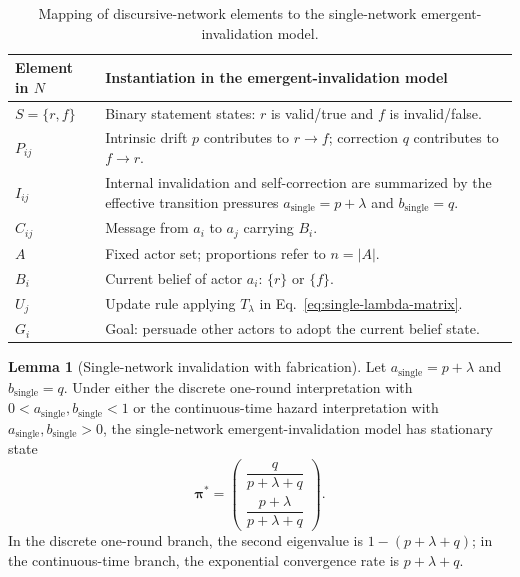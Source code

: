 \documentclass[12pt]{article}
\theoremstyle{definition}
\newtheorem{lemma}{Lemma}[section]
\begin{document}
\begin{table}[htbp]
    \centering
    \setlength{\tabcolsep}{6pt}
    \renewcommand{\arraystretch}{1.15}
    \caption{Mapping of discursive-network elements to the single-network emergent-invalidation model.}
    \label{tab:Single-Network-Invalidation}
    \begin{tabularx}{6.5in}{@{}lX@{}}
        \toprule
        \textbf{Element in $N$} & \textbf{Instantiation in the emergent-invalidation model} \\
        \midrule
        $S=\{r,f\}$ & Binary statement states: $r$ is valid/true and $f$ is invalid/false.\\
        $P_{ij}$ & Intrinsic drift $p$ contributes to $r\to f$; correction $q$ contributes to $f\to r$.\\
        $I_{ij}$ & Internal invalidation and self-correction are summarized by the effective transition pressures $a_{\mathrm{single}}=p+\lambda$ and $b_{\mathrm{single}}=q$.\\
        $C_{ij}$ & Message from $a_i$ to $a_j$ carrying $B_i$.\\
        $A$ & Fixed actor set; proportions refer to $n=|A|$.\\
        $B_i$ & Current belief of actor $a_i$: $\{r\}$ or $\{f\}$.\\
        $U_j$ & Update rule applying $T_{\lambda}$ in Eq.~\eqref{eq:single-lambda-matrix}.\\
        $G_i$ & Goal: persuade other actors to adopt the current belief state.\\
        \bottomrule
    \end{tabularx}
\end{table}

\begin{lemma}[Single-network invalidation with fabrication]
\label{lem:single_lambda}
Let $a_{\mathrm{single}}=p+\lambda$ and $b_{\mathrm{single}}=q$.  Under
either the discrete one-round interpretation with
$0<a_{\mathrm{single}},b_{\mathrm{single}}<1$ or the continuous-time hazard
interpretation with $a_{\mathrm{single}},b_{\mathrm{single}}>0$, the
single-network emergent-invalidation model has stationary state
\[
\boldsymbol{\pi}^{*}
=
\begin{pmatrix}
\dfrac{q}{p+\lambda+q}\\[6pt]
\dfrac{p+\lambda}{p+\lambda+q}
\end{pmatrix}.
\]
In the discrete one-round branch, the second eigenvalue is
$1-(p+\lambda+q)$; in the continuous-time branch, the exponential convergence
rate is $p+\lambda+q$.
\end{lemma}
\end{document}
